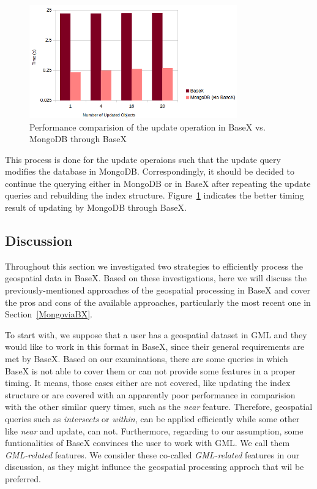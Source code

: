 \documentclass[a4paper,12pt]{article}
\begin{document}
\begin{figure}
\centering
\includegraphics[width=0.8\textwidth]{MongoviaBX-Update-sec-log.png}
\caption{Performance comparision of the update operation in BaseX vs. MongoDB through BaseX}
\label{figMongoviaBX-update}
\end{figure}

This process is done for the update operaions such that the update query modifies the database in MongoDB. Correspondingly, it should be decided to continue the querying either in MongoDB or in BaseX after repeating the update queries and rebuilding the index structure. Figure~\ref{figMongoviaBX-update} indicates the better timing result of updating by MongoDB through BaseX. 

\subsection{Discussion}
\label{s.disc}
Throughout this section we investigated two strategies to efficiently process the geospatial data in BaseX. Based on these investigations, here we will discuss the  previously-mentioned approaches of the geospatial processing in BaseX and cover the pros and cons of the available approaches, particularly the most recent one in Section~\ref{MongoviaBX}. 

To start with, we suppose that a user has a geospatial dataset in GML and they would like to work in this format in BaseX, since their general requirements are met by BaseX. Based on our examinations, there are some queries in which BaseX is not able to cover them or can not provide some features in a proper timing. It means, those cases either are not covered, like updating the index structure or are covered with an apparently poor performance in comparision with the other similar query times, such as the \textit{near} feature. Therefore, geospatial queries such as \textit{intersects} or \textit{within}, can be applied efficiently while some other like \textit{near} and update, can not. Furthermore, regarding to our assumption, some funtionalities of BaseX convinces the user to work with GML. We call them \textit{GML-related} features. We consider these co-called \textit{GML-related} features in our discussion, as they might influnce the geospatial processing approch that wil be preferred.
\end{document}
